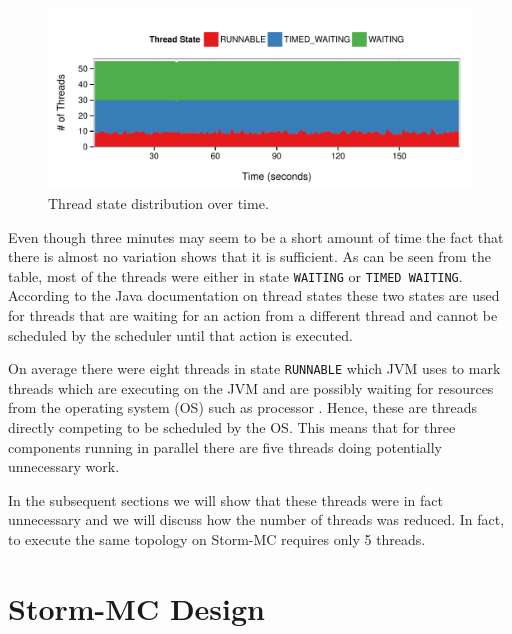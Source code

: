 \documentclass[bsc,logo,frontabs,twoside,singlespacing,normalheadings,parskip]{infthesis}\usepackage[]{graphicx}\usepackage[]{color}
\makeatletter
\def\maxwidth{ %
  \ifdim\Gin@nat@width>\linewidth
    \linewidth
  \else
    \Gin@nat@width
  \fi
}
\newenvironment{knitrout}{}{} %
\makeatother
\begin{document}
\begin{knitrout}
\color{fgcolor}\begin{figure}[!htb]
\includegraphics[width=\maxwidth]{figure/dump-plot-1} \caption[Thread state distribution over time]{Thread state distribution over time.}\label{fig:dump-plot}
\end{figure}


\end{knitrout}

Even though three minutes may seem to be a short amount of time the fact that there is almost no variation shows that it is sufficient. As can be seen from the table, most of the threads were either in state \texttt{WAITING} or \texttt{TIMED WAITING}. According to the Java documentation on thread states \citep{JavaThreads} these two states are used for threads that are waiting for an action from a different thread and cannot be scheduled by the scheduler until that action is executed.

On average there were eight threads in state \texttt{RUNNABLE} which JVM uses to mark threads which are executing on the JVM and are possibly waiting for resources from the operating system (OS) such as processor \citep{JavaThreads}. Hence, these are threads directly competing to be scheduled by the OS. This means that for three components running in parallel there are five threads doing potentially unnecessary work.

In the subsequent sections we will show that these threads were in fact unnecessary and we will discuss how the number of threads was reduced. In fact, to execute the same topology on Storm-MC requires only 5 threads.

\section{Storm-MC Design}
\label{sec:storm_mc_arch}
\end{document}
